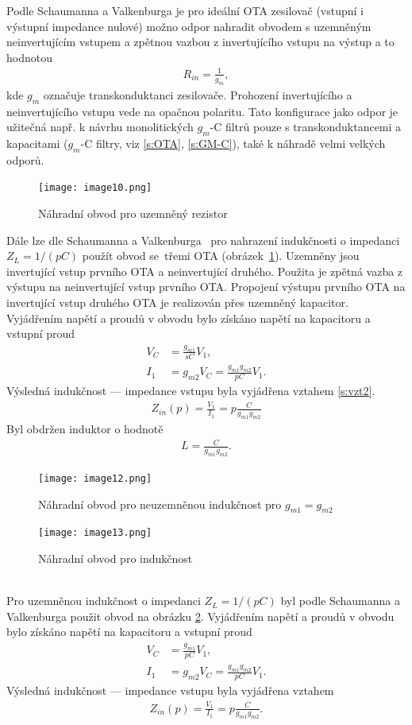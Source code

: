 \noindent Podle Schaumanna a Valkenburga \cite{13} je pro ideální OTA zesilovač (vstupní i výstupní impedance nulové) možno odpor nahradit obvodem s uzemněným neinvertujícím vstupem a zpětnou vazbou z invertujícího vstupu na výstup a to hodnotou
\begin{align}
R_{in} = \frac{1}{g_{m}},
\end{align}
kde $g_{m}$ označuje transkonduktanci zesilovače. Prohození invertujícího a neinvertujícího vstupu vede na opačnou polaritu. Tato konfigurace jako odpor je užitečná např. k návrhu monolitických $g_m$-C filtrů pouze s transkonduktancemi a kapacitami ($g_m$-C filtry, viz \ref{s:OTA}, \ref{s:GM-C}), také k náhradě velmi velkých odporů.
\begin{figure}[h]
\centering
\texttt{[image: image10.png]}
\caption[Náhradní obvod pro uzemněný rezistor]{Náhradní obvod pro uzemněný rezistor}
\end{figure}
\noindent Dále lze dle Schaumanna a Valkenburga~\cite{13} pro nahrazení indukčnosti o impedanci $Z_L = 1/(pC)$ použít obvod se~třemi OTA (obrázek~\ref{s:IND0}). Uzemněny jsou invertující vstup prvního OTA a neinvertující druhého. Použita je zpětná vazba z výstupu na neinvertující vstup prvního OTA. Propojení výstupu prvního OTA na invertující vstup druhého OTA je realizován přes uzemněný kapacitor. \\
Vyjádřením napětí a proudů v obvodu bylo získáno napětí na kapacitoru a vstupní proud
\begin{align}\label{s:vzt2}
V_C &= \frac{g_{m1}}{sC}V_1, \\
I_1 &= g_{m2}V_C = \frac{g_{m1}g_{m2}}{pC}V_1.
\end{align}
Výsledná indukčnost --- impedance vstupu byla vyjádřena vztahem \ref{s:vzt2}.
\begin{align}
Z_{in}(p) = \frac{V_1}{I_1} = p\frac{C}{g_{m1}g_{m2}}
\end{align}
\noindent Byl obdržen induktor o hodnotě
\begin{align}
L = \frac{C}{g_{m1}g_{m2}}.
\end{align}
\begin{figure}[h]
\centering
\texttt{[image: image12.png]}
\caption[Náhradní obvod pro neuzemněnou indukčnost]{Náhradní obvod pro neuzemněnou indukčnost pro $g_{m1} = g_{m2}$ \label{s:IND0}}
\end{figure}
\begin{figure}[h]
\centering
\texttt{[image: image13.png]}
\caption[Náhradní obvod pro indukčnost]{Náhradní obvod pro indukčnost \label{s:IND}}
\end{figure}
\\
\noindent Pro uzemněnou indukčnost o impedanci $Z_L = 1/(pC)$ byl podle Schaumanna a Valkenburga \cite{13} použit obvod na obrázku \ref{s:IND}. Vyjádřením napětí a proudů v obvodu bylo získáno napětí na kapacitoru a vstupní proud
\begin{align}
V_C &= \frac{g_{m1}}{pC}V_1, \\
I_1 &= g_{m2}V_C = \frac{g_{m1}g_{m2}}{pC}V_1.
\end{align}
Výsledná indukčnost --- impedance vstupu byla vyjádřena vztahem
\begin{align}
Z_{in}(p) = \frac{V_1}{I_1} = p\frac{C}{g_{m1}g_{m2}}.
\end{align}
